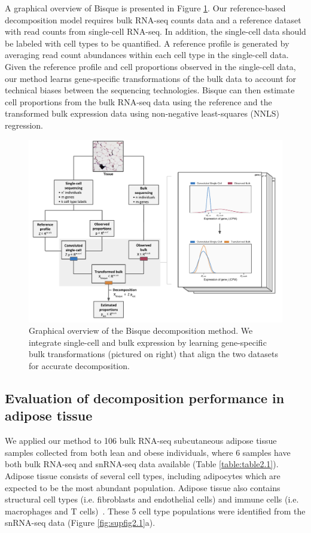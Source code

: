 A graphical overview of Bisque is presented in Figure \ref{fig:fig2.1}. Our reference-based decomposition model requires bulk RNA-seq counts data and a reference dataset with read counts from single-cell RNA-seq. In addition, the single-cell data should be labeled with cell types to be quantified. A reference profile is generated by averaging read count abundances within each cell type in the single-cell data. Given the reference profile and cell proportions observed in the single-cell data, our method learns gene-specific transformations of the bulk data to account for technical biases between the sequencing technologies. Bisque can then estimate cell proportions from the bulk RNA-seq data using the reference and the transformed bulk expression data using non-negative least-squares (NNLS) regression. 

\begin{figure}
    \centering
    \includegraphics[width=\textwidth]{chapter2/figures/fig1.pdf}
    \caption{
            Graphical overview of the Bisque decomposition method. We integrate single-cell and bulk expression by learning gene-specific bulk transformations (pictured on right) that align the two datasets for accurate decomposition.
            }
    \label{fig:fig2.1}
\end{figure}

\subsection{Evaluation of decomposition performance in adipose tissue}
We applied our method to 106 bulk RNA-seq subcutaneous adipose tissue samples collected from both lean and obese individuals, where 6 samples have both bulk RNA-seq and snRNA-seq data available (Table \ref{table:table2.1}). Adipose tissue consists of several cell types, including adipocytes which are expected to be the most abundant population. Adipose tissue also contains structural cell types (i.e. fibroblasts and endothelial cells) and immune cells (i.e. macrophages and T cells)~\cite{Esteve_Rafols2014-ia}. These 5 cell type populations were identified from the snRNA-seq data (Figure \ref{fig:supfig2.1}a).

